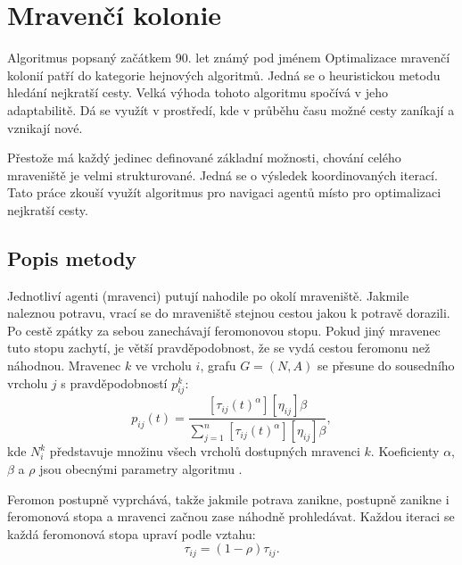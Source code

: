 \section{Mravenčí kolonie}
Algoritmus popsaný začátkem 90. let známý pod jménem Optimalizace mravenčí kolonií patří do kategorie hejnových algoritmů. \cite{Colorni1991} Jedná se o heuristickou metodu hledání nejkratší cesty. Velká výhoda tohoto algoritmu spočívá v jeho adaptabilitě. Dá se využít v prostředí, kde v průběhu času možné cesty zaníkají a vznikají nové. 
\par
Přestože má každý jedinec definované základní možnosti, chování celého mraveniště je velmi strukturované. Jedná se o výsledek koordinovaných iterací. Tato práce zkouší využít algoritmus pro navigaci agentů místo pro optimalizaci nejkratší cesty. 

\subsection{Popis metody}
Jednotliví agenti (mravenci) putují nahodile po okolí mraveniště. Jakmile naleznou potravu, vrací se do mraveniště stejnou cestou jakou k potravě dorazili. Po cestě zpátky za sebou zanechávají feromonovou stopu. Pokud jiný mravenec tuto stopu zachytí, je větší pravděpodobnost, že se vydá cestou feromonu než náhodnou. Mravenec $k$ ve vrcholu $i$, grafu $G = (N, A)$ se přesune do sousedního vrcholu $j$ s pravděpodobností $p_{ij}^k$:  
\begin{equation*}
p_{ij}(t) = \frac{[\tau_{ij}(t)^\alpha] [\eta_{ij}]\beta}{\sum\limits_{j=1}^n{[\tau_{ij}(t)^\alpha] [\eta_{ij}]\beta}},
\end{equation*}
kde $N_i^k$ představuje množinu všech vrcholů dostupných mravenci $k$. Koeficienty $\alpha$, $\beta$ a $\rho$ jsou obecnými parametry algoritmu \cite{Blum2005}. 
\par
Feromon postupně vyprchává, takže jakmile potrava zanikne, postupně zanikne i feromonová stopa a mravenci začnou zase náhodně prohledávat. Každou iteraci se každá feromonová stopa upraví podle vztahu:
\begin{equation*}
\tau_{ij} = (1 - \rho)\tau_{ij}.
\end{equation*}


